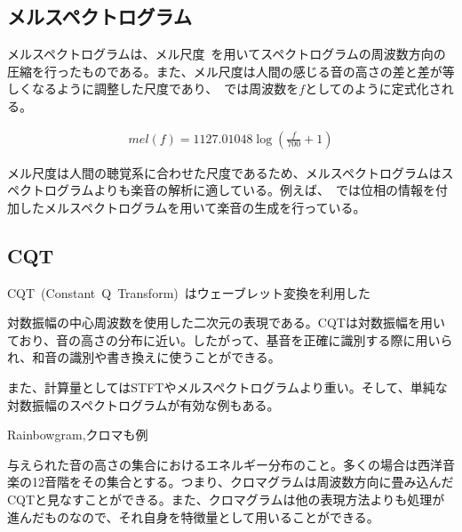 \clearpage

\subsection{メルスペクトログラム}

メルスペクトログラムは、メル尺度~\cite{melscale}を用いてスペクトログラムの周波数方向の圧縮を行ったものである。また、メル尺度は人間の感じる音の高さの差と差が等しくなるように調整した尺度であり、~\cite{mel}では周波数を$f$としてのように定式化される。

\begin{align}
    \label{eq:mel}
    mel(f)=1127.01048\log{(\frac{f}{700}+1)}
\end{align}

メル尺度は人間の聴覚系に合わせた尺度であるため、メルスペクトログラムはスペクトログラムよりも楽音の解析に適している。例えば、~\cite{GANSynth}では位相の情報を付加したメルスペクトログラムを用いて楽音の生成を行っている。

\subsection{CQT}

CQT~(Constant~Q~Transform)~はウェーブレット変換を利用した

対数振幅の中心周波数を使用した二次元の表現である。CQTは対数振幅を用いており、音の高さの分布に近い。したがって、基音を正確に識別する際に用いられ、和音の識別や書き換えに使うことができる。

また、計算量としてはSTFTやメルスペクトログラムより重い。そして、単純な対数振幅のスペクトログラムが有効な例もある。

Rainbowgram,クロマも例

与えられた音の高さの集合におけるエネルギー分布のこと。多くの場合は西洋音楽の12音階をその集合とする。つまり、クロマグラムは周波数方向に畳み込んだCQTと見なすことができる。また、クロマグラムは他の表現方法よりも処理が進んだものなので、それ自身を特徴量として用いることができる。

